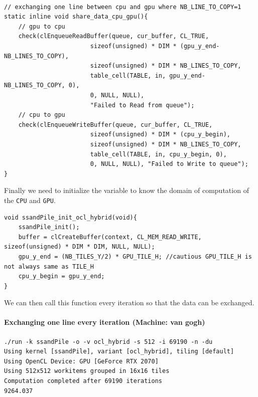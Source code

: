 \documentclass{report}
\def\CPU{\texttt{CPU}}
\def\GPU{\texttt{GPU}}
\begin{document}
\begin{listing}[H]
	\begin{verbatim}

// exchanging one line between cpu and gpu where NB_LINE_TO_COPY=1
static inline void share_data_cpu_gpu(){
    // gpu to cpu
    check(clEnqueueReadBuffer(queue, cur_buffer, CL_TRUE, 
                        sizeof(unsigned) * DIM * (gpu_y_end-NB_LINES_TO_COPY), 
                        sizeof(unsigned) * DIM * NB_LINES_TO_COPY, 
                        table_cell(TABLE, in, gpu_y_end-NB_LINES_TO_COPY, 0), 
                        0, NULL, NULL),
                        "Failed to Read from queue");
    // cpu to gpu
    check(clEnqueueWriteBuffer(queue, cur_buffer, CL_TRUE, 
                        sizeof(unsigned) * DIM * (cpu_y_begin),
                        sizeof(unsigned) * DIM * NB_LINES_TO_COPY, 
                        table_cell(TABLE, in, cpu_y_begin, 0), 
                        0, NULL, NULL), "Failed to Write to queue");
}
\end{verbatim}
	\caption{Function to exchange data between \CPU{} and \GPU{}}
\end{listing}

Finally we need to initialize the variable to know the domain of computation of the \CPU{} and \GPU{}.

\begin{listing}[H]
	\begin{verbatim}
void ssandPile_init_ocl_hybrid(void){
    ssandPile_init();
    buffer = clCreateBuffer(context, CL_MEM_READ_WRITE, sizeof(unsigned) * DIM * DIM, NULL, NULL);
    gpu_y_end = (NB_TILES_Y/2) * GPU_TILE_H; //cautious GPU_TILE_H is not always same as TILE_H
    cpu_y_begin = gpu_y_end;
}
\end{verbatim}
	\caption{Function to exchange data between \CPU{} and \GPU{}}
\end{listing}


We can then call this function every iteration so that the data can be exchanged.
\paragraph{Exchanging one line every iteration (Machine: van gogh)}
\begin{verbatim}
./run -k ssandPile -o -v ocl_hybrid -s 512 -i 69190 -n -du
Using kernel [ssandPile], variant [ocl_hybrid], tiling [default]
Using OpenCL Device: GPU [GeForce RTX 2070]
Using 512x512 workitems grouped in 16x16 tiles 
Computation completed after 69190 iterations
9264.037 
\end{verbatim}
\end{document}

